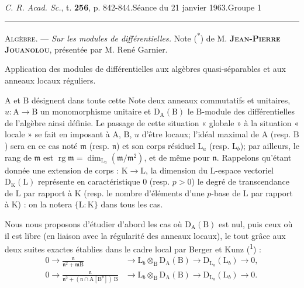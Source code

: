 \textit{C. R. Acad. Sc.}, t. \textbf{256}, p. 842-844.\hfill Séance du 21 janvier 1963.\hfill Groupe 1\par\noindent\rule{\linewidth}{0.4pt}

\textsc{Algèbre.} --- \textit{Sur les modules de différentielles.} Note (\textsuperscript{*}) de M. \textbf{\textsc{Jean-Pierre Jouanolou}}, présentée par M. René Garnier.

Application des modules de différentielles aux algèbres quasi-séparables et aux anneaux locaux réguliers.

$\mathrm A$ et $\mathrm B$ désignent dans toute cette Note deux anneaux commutatifs et unitaires, $u:\mathrm A\to\mathrm B$ un monomorphisme unitaire et $\mathrm D_{\mathrm A}(\mathrm B)$ le $\mathrm B$-module des différentielles de l’algèbre ainsi définie. Le passage de cette situation « globale » à la situation « locale » se fait en imposant à $\mathrm A$, $\mathrm B$, $u$ d’être locaux; l’idéal maximal de $\mathrm A$ (resp. $\mathrm B$) sera en ce cas noté $\mathfrak m$ (resp. $\mathfrak n$) et son corps résiduel $\mathrm L_a$ (resp. $\mathrm L_b$); par ailleurs, le rang de $\mathfrak m$ est $\operatorname{rg}\mathfrak m=\dim_{\mathrm L_a}(\mathfrak m/\mathfrak m^2)$, et de même pour $\mathfrak n$. Rappelons qu’étant donnée une extension de corps : $\mathrm K\to\mathrm L$, la dimension du $\mathrm L$-espace vectoriel $\mathrm D_{\mathrm K}(\mathrm L)$ représente en caractéristique $0$ (resp. $p>0$) le degré de transcendance de $\mathrm L$ par rapport à $\mathrm K$ (resp. le nombre d’éléments d’une $p$-base de $\mathrm L$ par rapport à $\mathrm K$) : on la notera $\{\mathrm L:\mathrm K\}$ dans tous les cas.

Nous nous proposons d’étudier d’abord les cas où $\mathrm D_{\mathrm A}(\mathrm B)$ est nul, puis ceux où il est libre (en liaison avec la régularité des anneaux locaux), le tout grâce aux deux suites exactes établies dans le cadre local par Berger et Kunz (\textsuperscript{1}) :
\[
\begin{aligned}
0\to\frac{\mathfrak n}{\mathfrak n^2+\mathfrak m\mathrm B}&\to\mathrm L_b\otimes_{\mathrm B}\mathrm D_{\mathrm A}(\mathrm B)\to\mathrm D_{\mathrm L_a}(\mathrm L_b)\to0,\\
0\to\frac{\mathfrak n}{\mathfrak n^2+(\mathfrak n\cap\mathrm A[\mathrm B^p])\,\mathrm B}&\to\mathrm L_b\otimes_{\mathrm B}\mathrm D_{\mathrm A}(\mathrm B)\to\mathrm D_{\mathrm L_a}(\mathrm L_b)\to0.
\end{aligned}
\]

